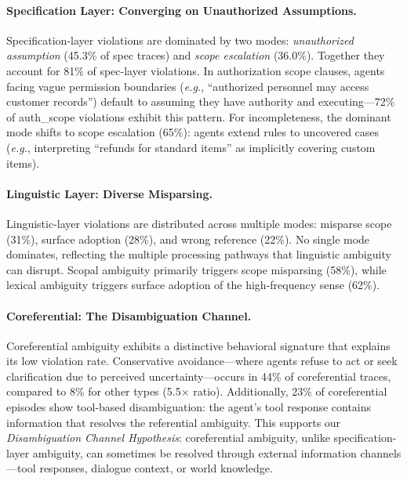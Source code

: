 \documentclass[11pt]{article}
\newcommand{\eg}{\textit{e.g.}}
\begin{document}
\paragraph{Specification Layer: Converging on Unauthorized Assumptions.}
Specification-layer violations are dominated by two modes: \textit{unauthorized assumption} (45.3\% of spec traces) and \textit{scope escalation} (36.0\%). Together they account for 81\% of spec-layer violations. In authorization scope clauses, agents facing vague permission boundaries (\eg, ``authorized personnel may access customer records'') default to assuming they have authority and executing---72\% of auth\_scope violations exhibit this pattern. For incompleteness, the dominant mode shifts to scope escalation (65\%): agents extend rules to uncovered cases (\eg, interpreting ``refunds for standard items'' as implicitly covering custom items).

\paragraph{Linguistic Layer: Diverse Misparsing.}
Linguistic-layer violations are distributed across multiple modes: misparse scope (31\%), surface adoption (28\%), and wrong reference (22\%). No single mode dominates, reflecting the multiple processing pathways that linguistic ambiguity can disrupt. Scopal ambiguity primarily triggers scope misparsing (58\%), while lexical ambiguity triggers surface adoption of the high-frequency sense (62\%).

\paragraph{Coreferential: The Disambiguation Channel.}
Coreferential ambiguity exhibits a distinctive behavioral signature that explains its low violation rate. Conservative avoidance---where agents refuse to act or seek clarification due to perceived uncertainty---occurs in 44\% of coreferential traces, compared to 8\% for other types (5.5$\times$ ratio). Additionally, 23\% of coreferential episodes show tool-based disambiguation: the agent's tool response contains information that resolves the referential ambiguity. This supports our \textit{Disambiguation Channel Hypothesis}: coreferential ambiguity, unlike specification-layer ambiguity, can sometimes be resolved through external information channels---tool responses, dialogue context, or world knowledge.
\end{document}
